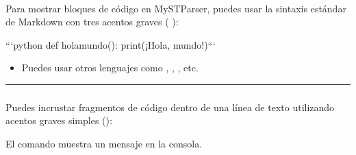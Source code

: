 \documentclass[a4paper,10pt,spanish]{sphinxmanual}
\begin{document}
\paragraph{}
\label{\detokenize{configuracion_inicial/013.guia_de_myst_parser:bloques-de-codigo-code-blocks}}
\sphinxAtStartPar
Para mostrar bloques de código en MyST\sphinxhyphen{}Parser, puedes usar la sintaxis estándar de Markdown con tres acentos graves (  ):

\begin{sphinxVerbatim}[commandchars=\\\{\}]
	```python
	def hola\PYGZus{}mundo():
	    print(\PYGZdq{}¡Hola, mundo!\PYGZdq{})```
\end{sphinxVerbatim}

\sphinxAtStartPar
{}

\begin{sphinxVerbatim}[commandchars=\\\{\}]
 
\end{sphinxVerbatim}
\begin{itemize}
\item {} 
\sphinxAtStartPar
Puedes usar otros lenguajes como , , , etc.

\end{itemize}


\bigskip\hrule\bigskip



\subsubsection{}
\label{\detokenize{configuracion_inicial/013.guia_de_myst_parser:incrustar-codigo-en-linea}}
\sphinxAtStartPar
Puedes incrustar fragmentos de código dentro de una línea de texto utilizando acentos graves simples (\textasciigrave{}):

\begin{sphinxVerbatim}[commandchars=\\\{\}]
El comando  muestra un mensaje en la consola.
\end{sphinxVerbatim}
\end{document}
